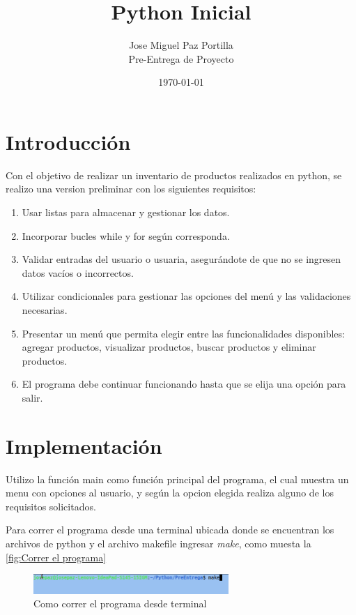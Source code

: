 \documentclass[12pt]{article}
\title{Python Inicial}
\author{Jose Miguel Paz Portilla\\Pre-Entrega de Proyecto}
\date{\today}
\begin{document}
\maketitle
\thispagestyle{empty}
\newpage

\tableofcontents
\newpage

\section{Introducción}

Con el objetivo de realizar un inventario de productos realizados en python, se realizo una version preliminar con los siguientes requisitos:

\begin{enumerate}
	\item Usar listas para almacenar y gestionar los datos.
	\item Incorporar bucles while y for según corresponda. 
	\item Validar entradas del usuario o usuaria, asegurándote de que no se ingresen datos vacíos o incorrectos.
	\item Utilizar condicionales para gestionar las opciones del menú y las validaciones necesarias.
	\item Presentar un menú que permita elegir entre las funcionalidades disponibles: agregar productos, visualizar productos, buscar productos y eliminar productos.
	\item El programa debe continuar funcionando hasta que se elija una opción para salir.
\end{enumerate}

\section{Implementación}

Utilizo la función main como función principal del programa, el cual muestra un menu con opciones al usuario, y según la opcion elegida realiza alguno de los requisitos solicitados.

Para correr el programa desde una terminal ubicada donde se encuentran los archivos de python y el archivo makefile ingresar \textit{make}, como muesta la \autoref{fig:Correr el programa}

\begin{figure}[H]
	\centering
	\setlength{\fboxrule}{0pt}
	\includegraphics[width=0.66\textwidth]{img7.png}
	\caption{Como correr el programa desde terminal}
	\label{fig:Correr el programa}
\end{figure}  
\end{document}
